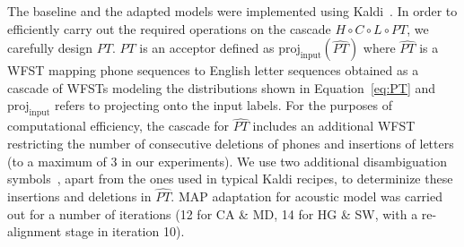The baseline and the adapted models were implemented using Kaldi~\cite{Kaldi2011}. In order to efficiently carry out the required operations on the cascade $H \circ C \circ L \circ PT$, we carefully design $PT$. $PT$ is an acceptor defined as $\mathrm{proj}_{\mathrm{input}} (\widehat{PT})$ where $\widehat{PT}$ is a WFST mapping phone sequences to English letter sequences obtained as a cascade of WFSTs modeling the distributions shown in Equation~\ref{eq:PT} and $\mathrm{proj}_{\mathrm{input}}$ refers to projecting onto the input labels. For the purposes of computational efficiency, the cascade for $\widehat{PT}$ includes an additional WFST restricting the number of consecutive deletions of phones and insertions of letters (to a maximum of 3 in our experiments). We use two additional disambiguation symbols~\cite{mohri2008speech}, apart from the ones used in typical Kaldi recipes, to determinize these insertions and deletions in $\widehat{PT}$. MAP adaptation for acoustic model was carried out for a number of iterations (12 for CA \& MD, 14 for HG \& SW, with a re-alignment stage in iteration 10).

